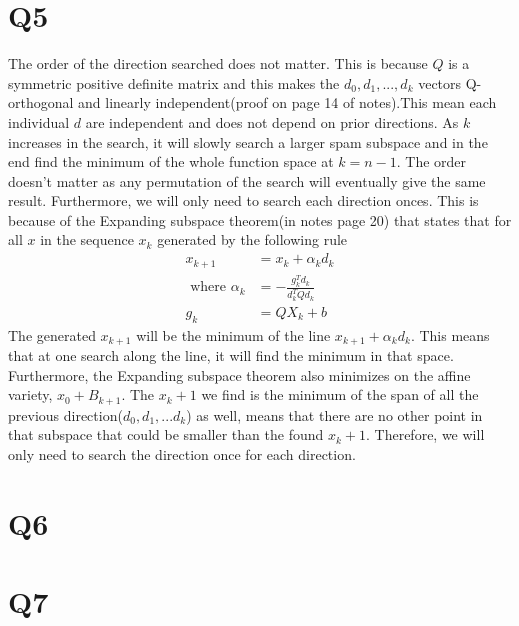 \documentclass{article}
\begin{document}
\section{Q5}
The order of the direction searched does not matter. This is because $Q$ is a symmetric positive definite matrix and this makes the $d_0,d_1,...,d_k$ vectors Q-orthogonal and linearly independent(proof on page 14 of notes).This mean each individual $d$ are independent and does not depend on prior directions. As $k$ increases in the search, it will slowly search a larger spam subspace and in the end find the minimum of the whole function space at $k=n-1$. The order doesn't matter as any permutation of the search will eventually give the same result.
Furthermore, we will only need to search each direction onces. This is because of the Expanding subspace theorem(in notes page 20) that states that for all $x$ in the sequence ${x_k}$ generated by the following rule
\begin{equation*}
\begin{aligned}
x_{k+1} &= x_k + \alpha_k d_k\\
\mbox{ where } \alpha_k &= - \frac{g_k^Td_k}{d_k^TQd_k}\\
g_k &= QX_k + b
\end{aligned}
\end{equation*}
The generated $x_{k+1}$ will be the minimum of the line $x_{k+1} + \alpha_k d_k$. This means that at one search along the line, it will find the minimum in that space. Furthermore, the Expanding subspace theorem also minimizes on the affine variety, $x_0 + B_{k+1}$. The $x_k+1$ we find is the minimum of the span of all the previous direction($d_0, d_1, ... d_k$) as well, means that there are no other point in that subspace that could be smaller than the found $x_k+1$. Therefore, we will only need to search the direction once for each direction.
\section{Q6}

\section{Q7}

\end{document}
